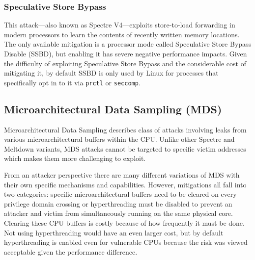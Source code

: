 \subsubsection{Speculative Store Bypass}
This attack---also known as Spectre V4---exploits store-to-load forwarding in modern processors to learn the contents of recently written memory locations.
The only available mitigation is a processor mode called Speculative Store Bypass Disable (SSBD), but enabling it has severe negative performance impacts.
Given the difficulty of exploiting Speculative Store Bypass and the considerable cost of mitigating it, by default SSBD is only used by Linux for processes that specifically opt in to it via \texttt{prctl} or \texttt{seccomp}.

\subsection{Microarchitectural Data Sampling (MDS)}
Microarchitectural Data Sampling describes class of attacks involving leaks from various microarchitectural buffers within the CPU.
Unlike other Spectre and Meltdown variants, MDS attacks cannot be targeted to specific victim addresses which makes them more challenging to exploit.

From an attacker perspective there are many different variations of MDS with their own specific mechanisms and capabilities.
However, mitigations all fall into two categories: specific microarchitectural buffers need to be cleared on every privilege domain crossing or hyperthreading must be disabled to prevent an attacker and victim from simultaneously running on the same physical core.
Clearing these CPU buffers is costly because of how frequently it must be done.
Not using hyperthreading would have an even larger cost, but by default
hyperthreading is enabled even for vulnerable CPUs because the risk was viewed acceptable given the performance difference.



